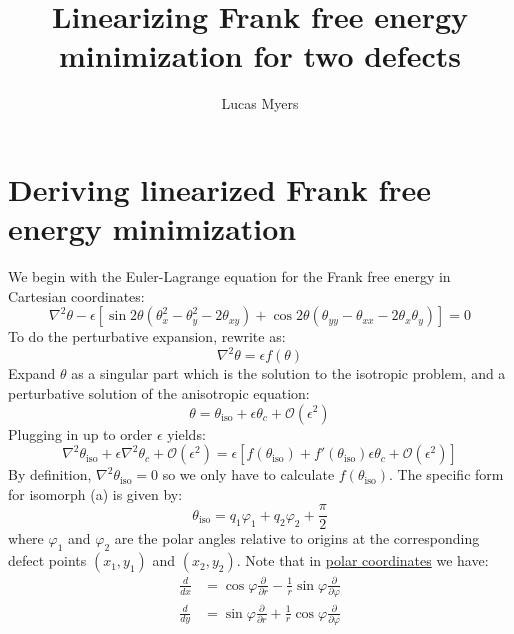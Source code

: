 \documentclass[reqno]{article}
\begin{document}
\title{Linearizing Frank free energy minimization for two defects}
\author{Lucas Myers}
\maketitle

\section{Deriving linearized Frank free energy minimization}

We begin with the Euler-Lagrange equation for the Frank free energy in Cartesian coordinates:
\begin{equation} \label{eq:Euler-Lagrange}
    \nabla^2 \theta
    - \epsilon \left[
        \sin 2\theta \left(\theta_x^2 - \theta_y^2 - 2 \theta_{xy}\right)
        + \cos 2\theta \left(\theta_{yy} - \theta_{xx} - 2 \theta_x \theta_y \right)
    \right]
    =
    0
\end{equation}
To do the perturbative expansion, rewrite as:
\begin{equation*}
    \nabla^2 \theta
    = \epsilon f(\theta)
\end{equation*}
Expand $\theta$ as a singular part which is the solution to the isotropic problem, and a perturbative solution of the anisotropic equation:
\begin{equation*}
    \theta = \theta_\text{iso} + \epsilon \theta_c + \mathcal{O}(\epsilon^2)
\end{equation*}
Plugging in up to order $\epsilon$ yields:
\begin{equation*}
    \nabla^2 \theta_\text{iso}
    + \epsilon \nabla^2 \theta_c
    + \mathcal{O}(\epsilon^2)
    =
    \epsilon \left[ f(\theta_\text{iso}) + f'(\theta_\text{iso}) \epsilon \theta_c + \mathcal{O}(\epsilon^2) \right]
\end{equation*}
By definition, $\nabla^2 \theta_\text{iso} = 0$ so we only have to calculate $f(\theta_\text{iso})$.
The specific form for isomorph (a) is given by:
\begin{equation}
    \theta_\text{iso}
    =
    q_1 \varphi_1 + q_2 \varphi_2 + \frac{\pi}{2}
\end{equation}
where $\varphi_1$ and $\varphi_2$ are the polar angles relative to origins at the corresponding defect points $(x_1, y_1)$ and $(x_2, y_2)$.
Note that in \href{https://www.wikiwand.com/en/Polar_coordinate_system#Differential_calculus}{polar coordinates} we have:
\begin{equation}
    \begin{split}
        \frac{d}{dx}
        &=
        \cos \varphi \frac{\partial}{\partial r} - \frac{1}{r} \sin\varphi \frac{\partial}{\partial \varphi} \\
        \frac{d}{dy}
        &=
        \sin \varphi \frac{\partial}{\partial r} + \frac{1}{r} \cos\varphi \frac{\partial}{\partial \varphi}
    \end{split}
\end{equation}
\end{document}
